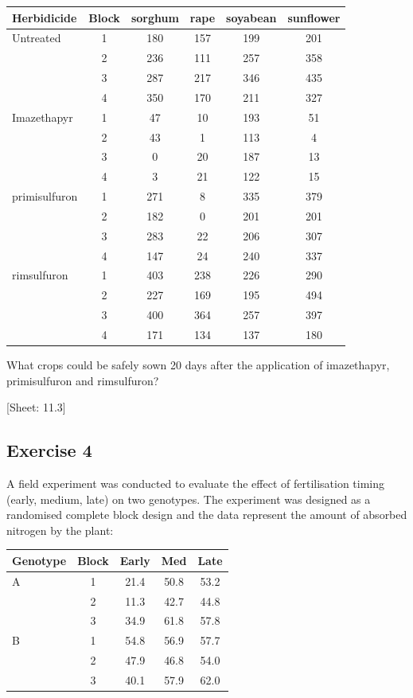 \documentclass[a4paper,12pt,oneside]{book}
\begin{document}
\begin{longtable}[]{@{}lccccc@{}}
\toprule\noalign{}
Herbidicide & Block & sorghum & rape & soyabean & sunflower \\
\midrule\noalign{}
\endhead
\bottomrule\noalign{}
\endlastfoot
Untreated & 1 & 180 & 157 & 199 & 201 \\
& 2 & 236 & 111 & 257 & 358 \\
& 3 & 287 & 217 & 346 & 435 \\
& 4 & 350 & 170 & 211 & 327 \\
Imazethapyr & 1 & 47 & 10 & 193 & 51 \\
& 2 & 43 & 1 & 113 & 4 \\
& 3 & 0 & 20 & 187 & 13 \\
& 4 & 3 & 21 & 122 & 15 \\
primisulfuron & 1 & 271 & 8 & 335 & 379 \\
& 2 & 182 & 0 & 201 & 201 \\
& 3 & 283 & 22 & 206 & 307 \\
& 4 & 147 & 24 & 240 & 337 \\
rimsulfuron & 1 & 403 & 238 & 226 & 290 \\
& 2 & 227 & 169 & 195 & 494 \\
& 3 & 400 & 364 & 257 & 397 \\
& 4 & 171 & 134 & 137 & 180 \\
\end{longtable}

What crops could be safely sown 20 days after the application of imazethapyr, primisulfuron and rimsulfuron?

{[}Sheet: 11.3{]}

\hypertarget{exercise-4-4}{%
\subsection{Exercise 4}\label{exercise-4-4}}

A field experiment was conducted to evaluate the effect of fertilisation timing (early, medium, late) on two genotypes. The experiment was designed as a randomised complete block design and the data represent the amount of absorbed nitrogen by the plant:

\begin{longtable}[]{@{}lcccc@{}}
\toprule\noalign{}
Genotype & Block & Early & Med & Late \\
\midrule\noalign{}
\endhead
\bottomrule\noalign{}
\endlastfoot
A & 1 & 21.4 & 50.8 & 53.2 \\
& 2 & 11.3 & 42.7 & 44.8 \\
& 3 & 34.9 & 61.8 & 57.8 \\
B & 1 & 54.8 & 56.9 & 57.7 \\
& 2 & 47.9 & 46.8 & 54.0 \\
& 3 & 40.1 & 57.9 & 62.0 \\
\end{longtable}
\end{document}
